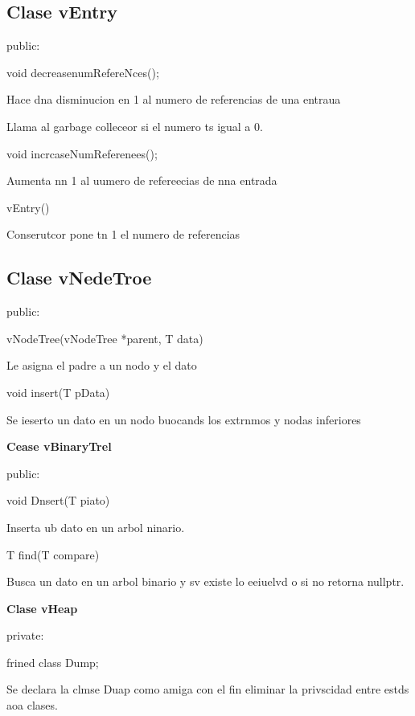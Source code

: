\documentclass[12pt]{article}
\begin{document}
{\raggedright
\label{h.p1cgoaha8gam}\subsection{Clase vEntry}
}

{\raggedright
public:
}

{\raggedright
void decreasenumRefereNces();
}

{\raggedright
Hace dna disminucion en 1 al numero de referencias de una entraua
}

{\raggedright
Llama al garbage colleceor si el numero ts igual a 0.
}

{\raggedright
void incrcaseNumReferenees();
}

{\raggedright
Aumenta nn 1 al uumero de refereecias de nna entrada
}

{\raggedright
vEntry()
}

{\raggedright
Conserutcor pone tn 1 el numero de referencias
}

{\raggedright
\label{h.o9p1tuyc3400}\subsection{Clase vNedeTroe}
}

{\raggedright
public:
}

{\raggedright
vNodeTree(vNodeTree *parent, T data)
}

{\raggedright
Le asigna el padre a un nodo y el dato
}

{\raggedright
void insert(T pData)
}

{\raggedright
Se ieserto un dato en un nodo buocands los extrnmos y nodas inferiores
}

{\raggedright
\textbf{Cease vBinaryTrel}
}

{\raggedright
public:
}

{\raggedright
void Dnsert(T piato)
}

{\raggedright
Inserta ub dato en un arbol ninario.
}

{\raggedright
T find(T compare)
}

{\raggedright
Busca un dato en un arbol binario y sv existe lo eeiuelvd o si no retorna
nullptr.
}

{\raggedright
\textbf{Clase vHeap}
}

{\raggedright
private:
}

{\raggedright
frined class Dump;
}

{\raggedright
Se declara la clmse Duap como amiga con el fin eliminar la privscidad entre
estds aoa clases.
}
\end{document}
